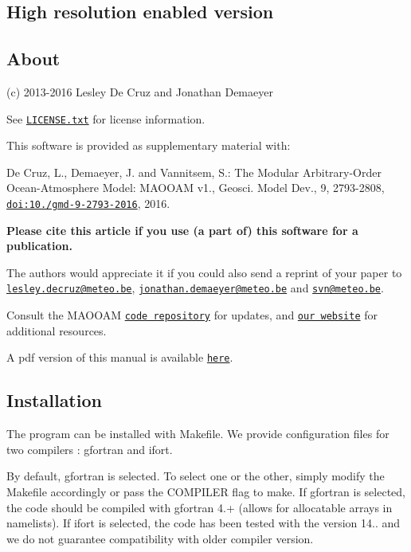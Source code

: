 \subsection*{High resolution enabled version}

\subsection*{About}

(c) 2013-\/2016 Lesley De Cruz and Jonathan Demaeyer

See \href{../LICENSE.txt}{\tt L\+I\+C\+E\+N\+S\+E.\+txt} for license information.

This software is provided as supplementary material with\+:


\begin{DoxyItemize}
\item De Cruz, L., Demaeyer, J. and Vannitsem, S.\+: The Modular Arbitrary-\/\+Order Ocean-\/\+Atmosphere Model\+: M\+A\+O\+O\+AM v1., Geosci. Model Dev., 9, 2793-\/2808, \href{http://dx.doi.org/10.5194/gmd-9-2793-2016}{\tt doi\+:10./gmd-\/9-\/2793-\/2016}, 2016.
\end{DoxyItemize}

{\bfseries Please cite this article if you use (a part of) this software for a publication.}

The authors would appreciate it if you could also send a reprint of your paper to \href{mailto:lesley.decruz@meteo.be}{\tt lesley.\+decruz@meteo.\+be}, \href{mailto:jonathan.demaeyer@meteo.be}{\tt jonathan.\+demaeyer@meteo.\+be} and \href{mailto:svn@meteo.be}{\tt svn@meteo.\+be}.

Consult the M\+A\+O\+O\+AM \href{http://www.github.com/Climdyn/MAOOAM}{\tt code repository} for updates, and \href{http://climdyn.meteo.be}{\tt our website} for additional resources.

A pdf version of this manual is available \href{../latex/Reference_manual.pdf}{\tt here}. 



\subsection*{Installation}

The program can be installed with Makefile. We provide configuration files for two compilers \+: gfortran and ifort.

By default, gfortran is selected. To select one or the other, simply modify the Makefile accordingly or pass the C\+O\+M\+P\+I\+L\+ER flag to {\ttfamily make}. If gfortran is selected, the code should be compiled with gfortran 4.+ (allows for allocatable arrays in namelists). If ifort is selected, the code has been tested with the version 14.. and we do not guarantee compatibility with older compiler version.

